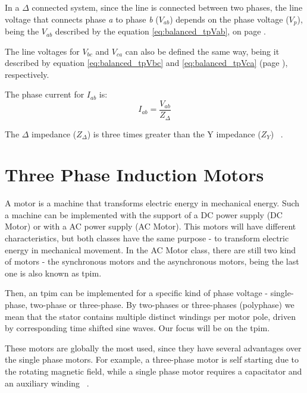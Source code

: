 In a $\Delta$ connected system, since the line is connected between two phases, the line voltage that connects phase \emph{a} to phase \emph{b} ($V_{ab}$) depends on the phase voltage ($V_{p}$), being the $V_{ab}$ described by the equation \ref{eq:balanced_tpVab}, on page \pageref{eq:balanced_tpVab}.

The line voltages for $V_{bc}$ and $V_{ca}$ can also be defined the same way, being it described by equation \ref{eq:balanced_tpVbc} and \ref{eq:balanced_tpVca} (page \pageref{eq:balanced_tpVab}), respectively. 

The phase current for $I_{ab}$ is:
\begin{equation} \label{eq:balanced_tpIab}
	I_{ab} = \frac{V_{ab}}{Z_{\Delta}}
\end{equation}

The $\Delta$ impedance ($Z_{\Delta}$) is three times greater than the Y impedance ($Z_{Y}$) ~\cite[chapter 11, p.~555]{Helfenstein2000}.




\section{Three Phase Induction Motors} %
\label{sec:three_phase_induction_motors}

A motor is a machine that transforms electric energy in mechanical energy.
Such a machine can be implemented with the support of a DC power supply (DC Motor) or with a AC power supply (AC Motor). This motors will have different characteristics, but both classes have the same purpose - to transform electric energy in mechanical movement.
In the AC Motor class, there are still two kind of motors - the synchronous motors and the asynchronous motors, being the last one is also known as \acrfull{tpim}.


Then, an \acrshort{tpim} can be implemented for a specific kind of phase voltage - single-phase, two-phase or three-phase.
By two-phases or three-phases (polyphase) we mean that the stator contains multiple distinct windings per motor pole, driven by corresponding time shifted sine waves.
Our focus will be on the \acrfull{tpim}.

These motors are  globally the most used, since they have several advantages over the single phase motors. For example, a three-phase motor is self starting due to the rotating magnetic field, while a single phase motor requires a capacitator and an auxiliary winding ~\cite{Ferreira1}.

